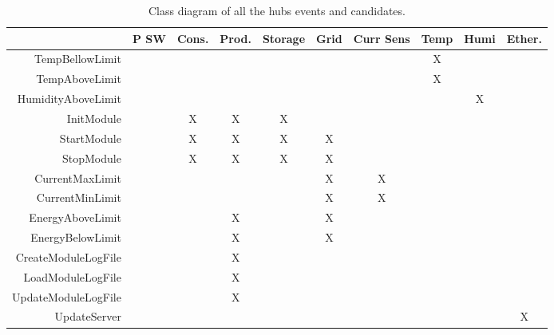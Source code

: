 	\begin{table}[H]
	\begin{tabular}{| r | c |c | c | c | c | c | c | c | c |}
	\hline
		~ & 					P SW & Cons. & Prod. & Storage & Grid & Curr Sens & Temp & Humi & Ether. \\ \hline
		TempBellowLimit 		& ~          & ~         & ~         & ~           & ~           & ~               & X      & ~ 	       & ~	\\ \hline
		TempAboveLimit 		& ~          & ~         & ~         & ~           & ~           & ~               & X      & ~ 	       & ~	\\ \hline
		HumidityAboveLimit	 	& ~          & ~         & ~         & ~           & ~           & ~               & ~      & X 	       & ~	\\ \hline
		InitModule 			& ~          & X         & X         & X           & ~           & ~              & ~      & ~ 	       & ~	\\ \hline
		StartModule 			& ~          & X         & X         & X           & X           & ~              & ~      & ~ 	       & ~	\\ \hline
		StopModule 			& ~          & X         & X         & X           & X           & ~              & ~      & ~ 	       & ~	\\ \hline
		CurrentMaxLimit	 	& ~          & ~         & ~         & ~           & X           & X               & ~      & ~ 	       & ~	\\ \hline
		CurrentMinLimit	 	& ~          & ~         & ~         & ~           & X           & X               & ~      & ~ 	       & ~	\\ \hline
		EnergyAboveLimit 		& ~          & ~         & X         & ~           & X           & ~               & ~      & ~ 	       & ~	\\ \hline
		EnergyBelowLimit 		& ~          & ~         & X         & ~           & X           & ~               & ~      & ~ 	       & ~	\\ \hline
		CreateModuleLogFile 	& ~          & ~         & X         & ~           & ~           & ~               & ~      & ~ 	       & ~	\\ \hline
		LoadModuleLogFile 	& ~          & ~         & X         & ~           & ~           & ~               & ~      & ~ 	       & ~	\\ \hline
		UpdateModuleLogFile 	& ~          & ~         & X         & ~           & ~           & ~               & ~      & ~ 	       & ~	\\ \hline
		UpdateServer			& ~          & ~         & ~         & ~           & ~           & ~               & ~      & ~ 	       & X	\\ \hline
	\end{tabular}
	\caption{Class diagram of all the hubs events and candidates.}
\end{table}
